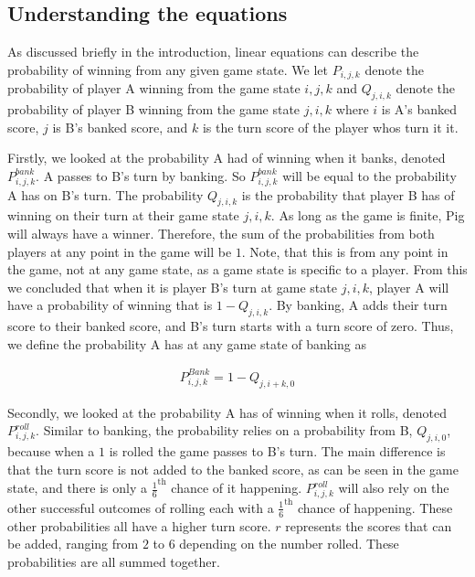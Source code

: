 \documentclass[a4paper,titlepage]{article}
\begin{document}
\subsection{Understanding the equations}

As discussed briefly in the introduction, linear equations can describe the probability of winning from any given game state. We let $P_{i,j,k}$ denote the probability of player A winning from the game state $i,j,k$ and $Q_{j,i,k}$ denote the probability of player B winning from the game state $j,i,k$ where $i$ is A's banked score, $j$ is B's banked score, and $k$ is the turn score of the player whos turn it it.

Firstly, we looked at the probability A had of winning when it banks, denoted $P^{bank}_{i,j,k}$. A passes to B's turn by banking. So $P^{bank}_{i,j,k}$ will be equal to the probability A has on B's turn. The probability $Q_{j,i,k}$ is the probability that player B has of winning on their turn at their game state $j,i,k$. As long as the game is finite, Pig will always have a winner. Therefore, the sum of the probabilities from both players at any point in the game will be $1$. Note, that this is from any point in the game, not at any game state, as a game state is specific to a player. From this we concluded that when it is player B's turn at game state $j,i,k$, player A will have a probability of winning that is $1-Q_{j,i,k}$. By banking, A adds their turn score to their banked score, and B's turn starts with a turn score of zero. Thus, we define the probability A has at any game state of banking as

\begin{align*}
P^{Bank}_{i,j,k} = 1-Q_{j,i+k,0}
\end{align*}

Secondly, we looked at the probability A has of winning when it rolls, denoted $P^{roll}_{i,j,k}$. Similar to banking, the probability relies on a probability from B, $Q_{j,i,0}$, because when a $1$ is rolled the game passes to B's turn. The main difference is that the turn score is not added to the banked score, as can be seen in the game state, and there is only a $\frac{1}{6}^\text{th}$ chance of it happening. $P^{roll}_{i,j,k}$ will also rely on the other successful outcomes of rolling each with a $\frac{1}{6}^\text{th}$ chance of happening. These other probabilities all have a higher turn score. $r$ represents the scores that can be added, ranging from $2$ to $6$ depending on the number rolled. These probabilities are all summed together.
\end{document}
